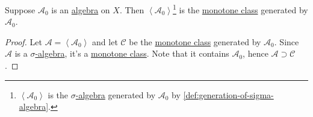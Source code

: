 \begin{theorem}\label{thm:monotone-class-lemma}
	Suppose \(\mathcal{A} _0\) is an \hyperref[def:algebra]{algebra} on \(X\). Then \(\left< \mathcal{A} _0 \right>\)\footnote{\(\left< \mathcal{A} _0 \right> \) is
		the \hyperref[def:sigma-algebra]{\(\sigma\)-algebra} generated by \(\mathcal{A} _0\) by \autoref{def:generation-of-sigma-algebra}.}
	is the \hyperref[def:monotone-class]{monotone class} generated by \(\mathcal{A} _0\).
\end{theorem}
\begin{proof}
	Let \(\mathcal{A}  = \left< \mathcal{A} _0 \right> \) and let \(\mathcal{C} \) be the \hyperref[def:monotone-class]{monotone class} generated by \(\mathcal{A} _0\). Since \(\mathcal{A} \) is a \hyperref[def:sigma-algebra]{\(\sigma\)-algebra}, it's a \hyperref[def:monotone-class]{monotone class}. Note that it contains \(\mathcal{A} _0\), hence \(\mathcal{A} \supset \mathcal{C} \).


\end{proof}

